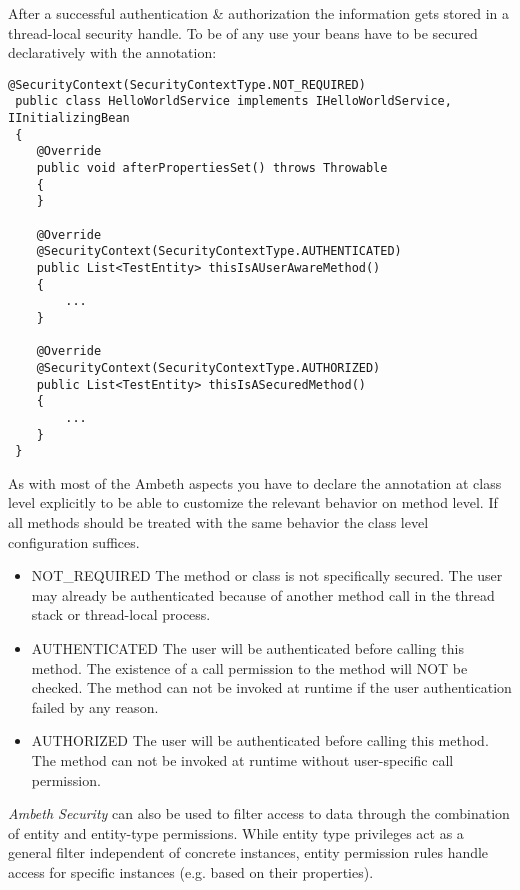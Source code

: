 After a successful authentication \& authorization the information gets stored in a thread-local security handle. To be of any use your beans have to be secured declaratively with the  annotation:

\begin{lstlisting}[style=Java]
@SecurityContext(SecurityContextType.NOT_REQUIRED)
 public class HelloWorldService implements IHelloWorldService, IInitializingBean
 {
 	@Override
 	public void afterPropertiesSet() throws Throwable
 	{
 	}
 
 	@Override
 	@SecurityContext(SecurityContextType.AUTHENTICATED)
 	public List<TestEntity> thisIsAUserAwareMethod()
 	{
 		...
 	}
 
 	@Override
 	@SecurityContext(SecurityContextType.AUTHORIZED)
 	public List<TestEntity> thisIsASecuredMethod()
 	{
 		...
 	}
 }
\end{lstlisting}
As with most of the Ambeth aspects you have to declare the annotation at class level explicitly to be able to customize the relevant behavior on method level. If all methods should be treated with the same behavior the class level configuration suffices.

\begin{itemize}
	\item NOT\_REQUIRED The method or class is not specifically secured. The user may already be authenticated because of another method call in the thread stack or thread-local process.
	\item AUTHENTICATED The user will be authenticated before calling this method. The existence of a call permission to the method will NOT be checked. The method can not be invoked at runtime if the user authentication failed by any reason.
	\item AUTHORIZED The user will be authenticated before calling this method. The method can not be invoked at runtime without user-specific call permission.
\end{itemize}


\textit{Ambeth Security} can also be used to filter access to data through the combination of entity and entity-type permissions. While entity type privileges act as a general filter independent of concrete instances, entity permission rules handle access for specific instances (e.g. based on their properties).